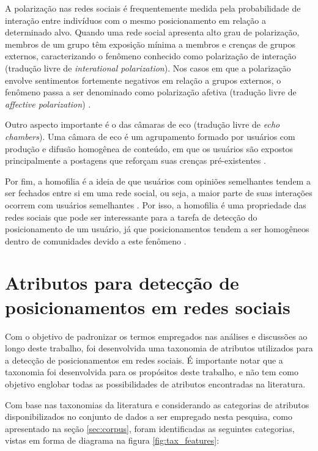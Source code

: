 \documentclass[
	12pt, oneside, a4paper, english, brazil
]{abntex2ppgsi}
\begin{document}
A polarização nas redes sociais é frequentemente medida pela probabilidade de interação entre indivíduos com o mesmo posicionamento em relação a determinado alvo. Quando uma rede social apresenta alto grau de polarização, membros de um grupo têm exposição mínima a membros e crenças de grupos externos, caracterizando o fenômeno conhecido como polarização de interação (tradução livre de {\em interational polarization}). Nos casos em que a polarização envolve sentimentos fortemente negativos em relação a grupos externos, o fenômeno passa a ser denominado como polarização afetiva (tradução livre de {\em affective polarization}) \cite{carley2020}.

Outro aspecto importante é o das câmaras de eco (tradução livre de {\em echo chambers}). Uma câmara de eco é um agrupamento formado por usuários com produção e difusão homogênea de conteúdo, em que os usuários são expostos principalmente a postagens que reforçam suas crenças pré-existentes \cite{lucie2022}.

Por fim, a homofilia é a ideia de que usuários com opiniões semelhantes tendem a ser fechados entre si em uma rede social, ou seja, a maior parte de suas interações ocorrem com usuários semelhantes \cite{homophily, espinosa2020deepreading}. Por isso, a homofilia é uma propriedade das redes sociais que pode ser interessante para a tarefa de detecção do posicionamento de um usuário, já que posicionamentos tendem a ser homogêneos dentro de comunidades devido a este fenômeno \cite{tanmoy2022, mohand2018}.

\section{Atributos para detecção de posicionamentos em redes sociais}
\label{sec:taxonomia}

Com o objetivo de padronizar os termos empregados nas análises e discussões ao longo deste trabalho, foi desenvolvida uma taxonomia de atributos utilizados para a detecção de posicionamentos em redes sociais. É importante notar que a taxonomia foi desenvolvida para os propósitos deste trabalho, e não tem como objetivo englobar todas as possibilidades de atributos encontradas na literatura.

Com base nas taxonomias da literatura e considerando as categorias de atributos disponibilizados no conjunto de dados a ser empregado nesta pesquisa, como apresentado na seção \ref{sec:corpus}, foram identificadas as seguintes categorias, vistas em forma de diagrama na figura \ref{fig:tax_features}:
\end{document}
